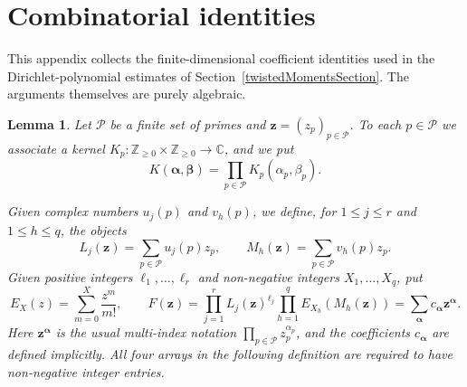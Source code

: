 \documentclass[oneside, 12pt]{amsart}
\newtheorem{lem}[thm]{Lemma}
\theoremstyle{definition}
\begin{document}
	{\section{Combinatorial identities}\label{appendixAlgebraicTransport}}
	{This appendix collects the finite-dimensional coefficient identities used in the Dirichlet-polynomial estimates of Section~\ref{twistedMomentsSection}.  The arguments themselves are purely algebraic.}
	\begin{lem}\label{coefficientKernelBookkeepingLemma}
		{Let $\mathcal{P}$ be a finite set of primes and $\mathbf{z}=(z_p)_{p \in \mathcal{P}}$. To each $p \in \mathcal{P}$ we associate a kernel $K_p:\mathbb{Z}_{\geq0}\times \mathbb{Z}_{\geq0}\to\mathbb{C}$, and we put
			\[
			K(\boldsymbol{\alpha},\boldsymbol{\beta})
			=\prod_{p\in\mathcal P}K_p(\alpha_p,\beta_p).
			\]}
		
		Given complex numbers $u_j(p)$ and $v_h(p)$, we define, for $1\leq j \leq r$ and $1\leq h \leq q$, the objects $$L_j(\mathbf{z})=\sum_{p \in \mathcal{P}} u_j(p)z_p, \qquad M_h(\mathbf{z})=\sum_{p\in \mathcal{P}} v_h(p)z_p.$$ {Given positive integers $\ell_1,\dots,\ell_r$ and non-negative integers $X_1,\dots,X_q$, put
			\[
			E_X(z)=\sum_{m=0}^{X}\frac{z^m}{m!},
			\qquad
			F(\mathbf{z})=\prod_{j=1}^rL_j(\mathbf z)^{\ell_j}
			\prod_{h=1}^qE_{X_h}(M_h(\mathbf z))
			=\sum_{\boldsymbol\alpha}c_{\boldsymbol\alpha}
			\mathbf z^{\boldsymbol\alpha}.
			\]}
		Here $\boldsymbol{z}^{\boldsymbol{\alpha}}$ is the usual multi-index notation $\prod_{p\in \mathcal{P}} z_p^{\alpha_p}$, and the coefficients $c_{\boldsymbol{\alpha}}$ are defined implicitly. 
		{All four arrays in the following definition are required to have
			non-negative integer entries.}
		

\end{lem}
\end{document}
